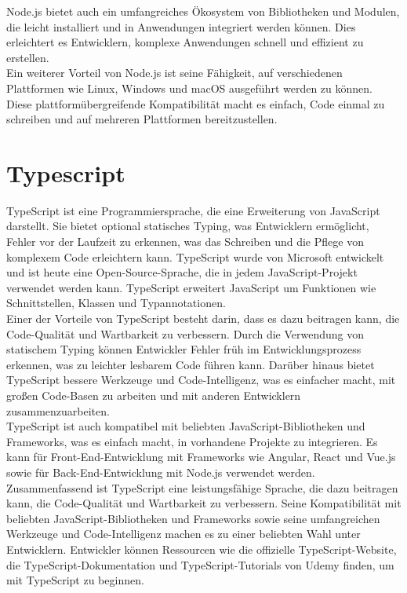 Node.js bietet auch ein umfangreiches Ökosystem von Bibliotheken und Modulen, die leicht installiert und in Anwendungen integriert werden können. Dies erleichtert es Entwicklern, komplexe Anwendungen schnell und effizient zu erstellen.\cite{Node.js.27.02.2023}\\

Ein weiterer Vorteil von Node.js ist seine Fähigkeit, auf verschiedenen Plattformen wie Linux, Windows und macOS ausgeführt werden zu können. Diese plattformübergreifende Kompatibilität macht es einfach, Code einmal zu schreiben und auf mehreren Plattformen bereitzustellen.\cite{Node.js.27.02.2023}\\

\section{Typescript}
TypeScript ist eine Programmiersprache, die eine Erweiterung von JavaScript darstellt. Sie bietet optional statisches Typing, was Entwicklern ermöglicht, Fehler vor der Laufzeit zu erkennen, was das Schreiben und die Pflege von komplexem Code erleichtern kann. TypeScript wurde von Microsoft entwickelt und ist heute eine Open-Source-Sprache, die in jedem JavaScript-Projekt verwendet werden kann. TypeScript erweitert JavaScript um Funktionen wie Schnittstellen, Klassen und Typannotationen.\cite{.01.03.2023b}\\

Einer der Vorteile von TypeScript besteht darin, dass es dazu beitragen kann, die Code-Qualität und Wartbarkeit zu verbessern. Durch die Verwendung von statischem Typing können Entwickler Fehler früh im Entwicklungsprozess erkennen, was zu leichter lesbarem Code führen kann. Darüber hinaus bietet TypeScript bessere Werkzeuge und Code-Intelligenz, was es einfacher macht, mit großen Code-Basen zu arbeiten und mit anderen Entwicklern zusammenzuarbeiten.\cite{.06.03.2023b}\\

TypeScript ist auch kompatibel mit beliebten JavaScript-Bibliotheken und Frameworks, was es einfach macht, in vorhandene Projekte zu integrieren. Es kann für Front-End-Entwicklung mit Frameworks wie Angular, React und Vue.js sowie für Back-End-Entwicklung mit Node.js verwendet werden.\cite{Udemy.06.03.2023}\\

Zusammenfassend ist TypeScript eine leistungsfähige Sprache, die dazu beitragen kann, die Code-Qualität und Wartbarkeit zu verbessern. Seine Kompatibilität mit beliebten JavaScript-Bibliotheken und Frameworks sowie seine umfangreichen Werkzeuge und Code-Intelligenz machen es zu einer beliebten Wahl unter Entwicklern. Entwickler können Ressourcen wie die offizielle TypeScript-Website, die TypeScript-Dokumentation und TypeScript-Tutorials von Udemy finden, um mit TypeScript zu beginnen.\cite{.01.03.2023}\\

